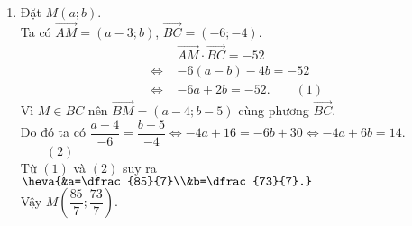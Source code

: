 \begin{bt}
{\begin{enumerate}
{
		}
		Vậy $D\left(-\dfrac{2}{3};-1\right)$.
		\item Đặt $M(a;b)$.\\
		Ta có $\overrightarrow{AM}=(a-3;b)$, $\overrightarrow{BC}=(-6;-4)$.\\
		\allowdisplaybreaks
		\begin{align*}
			&\overrightarrow{AM}\cdot \overrightarrow{BC}= -52
			\\
			\Leftrightarrow\,\,&-6(a-b)-4b=-52
			\\
			\Leftrightarrow\,\,&-6a+2b=-52. \qquad(1)
		\end{align*}
		Vì $M\in BC$ nên $\overrightarrow{BM}=(a-4;b-5)$ cùng phương $\overrightarrow{BC}$.\\
		Do đó ta có $\dfrac{a-4}{-6}=\dfrac{b-5}{-4}\Leftrightarrow -4a+16=-6b+30\Leftrightarrow -4a+6b=14$. $\qquad(2)$\\
		Từ $(1)$ và $(2)$ suy ra $\heva{&a=\dfrac{85}{7}\\&b=\dfrac{73}{7}.}$\\
		Vậy $M\left(\dfrac{85}{7};\dfrac{73}{7}\right)$.
	\end{enumerate}
	}
\end{bt}
